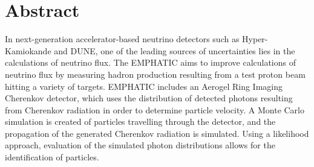 
\chapter{Abstract}

In next-generation accelerator-based neutrino detectors such as Hyper-Kamiokande and DUNE, one of the leading sources of uncertainties lies in the calculations of neutrino flux.
The \ac{EMPHATIC} aims to improve calculations of neutrino flux by measuring hadron production resulting from a test proton beam hitting a variety of targets.
\ac{EMPHATIC} includes an Aerogel Ring Imaging Cherenkov detector, which uses the distribution of detected photons resulting from Cherenkov radiation in order to determine particle velocity.
A Monte Carlo simulation is created of particles travelling through the detector, and the propagation of the generated Cherenkov radiation is simulated.
Using a likelihood approach, evaluation of the simulated photon distributions allows for the identification of particles.

\vfill
\begin{center}
\begin{sf}
\end{sf}
\end{center}
